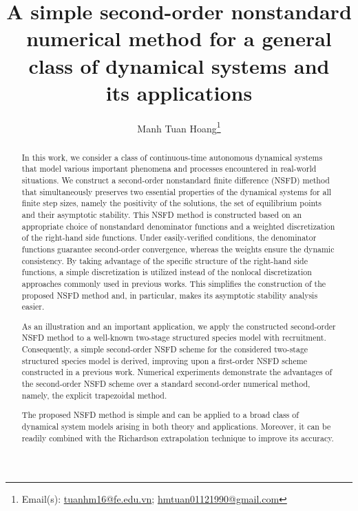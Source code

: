 \documentclass[12pt]{article}
\title{A simple second-order nonstandard numerical method for a general class of dynamical systems and\\ its applications}
\author{Manh Tuan Hoang\footnote{Email(s): \href{mailto:tuanhm16@fe.edu.vn}{tuanhm16@fe.edu.vn}; \href{mailto:hmtuan01121990@gmail.com}{hmtuan01121990@gmail.com}}}
\affil{Department of Mathematics, FPT University, Hoa Lac Hi-Tech Park, \\ Km29 Thang Long Blvd, Hanoi, Viet Nam}
\theoremstyle{definition}
\theoremstyle{remark}
\numberwithin{equation}{section}
\begin{document}
\maketitle


\begin{abstract}
In this work,  we consider a class of continuous-time autonomous dynamical systems that model various important phenomena and processes encountered in real-world situations. We construct a second-order nonstandard finite difference (NSFD) method that simultaneously preserves two essential properties of the dynamical systems for all finite step sizes, namely the positivity of the solutions, the set of equilibrium points and their asymptotic stability. This NSFD method is constructed based on an appropriate choice of nonstandard denominator functions and a weighted discretization of the right-hand side functions. Under easily-verified conditions, the denominator functions guarantee second-order convergence, whereas the weights ensure the dynamic consistency. By taking advantage of the specific structure of the right-hand side functions, a simple discretization is utilized instead of the nonlocal discretization approaches commonly used in previous works. This simplifies the construction of the proposed NSFD method and, in particular, makes its asymptotic stability analysis easier.

As an illustration and an important application, we apply the constructed second-order NSFD method to a well-known two-stage structured species model with recruitment. Consequently, a simple second-order NSFD scheme for the considered two-stage structured species model is derived, improving upon a first-order NSFD scheme constructed in a previous work. Numerical experiments demonstrate the advantages of the second-order NSFD scheme over a standard second-order numerical method, namely, the explicit trapezoidal method.


The proposed NSFD method is simple and can be applied to a broad class of dynamical system models arising in both theory and applications.  Moreover, it can be readily combined with the Richardson extrapolation technique to improve its accuracy.
\end{abstract}
\end{document}
